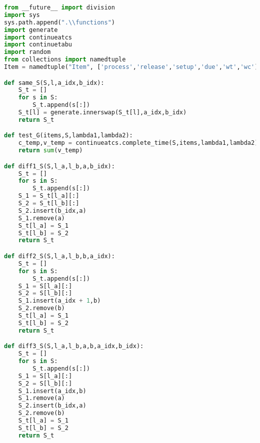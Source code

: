 \begin{lstlisting}[language = Python]
from __future__ import division
import sys
sys.path.append(".\\functions")
import generate
import continueatcs
import continuetabu
import random
from collections import namedtuple
Item = namedtuple("Item", ['process','release','setup','due','wt','wc'])

def same_S(S,l,a_idx,b_idx):
	S_t = []
	for s in S:
		S_t.append(s[:])
	S_t[l] = generate.innerswap(S_t[l],a_idx,b_idx)
	return S_t

def test_G(items,S,lambda1,lambda2):
	c_temp,v_temp = continueatcs.complete_time(S,items,lambda1,lambda2)
	return sum(v_temp)

def diff1_S(S,l_a,l_b,a,b_idx):
	S_t = []
	for s in S:
		S_t.append(s[:])
	S_1 = S_t[l_a][:]
	S_2 = S_t[l_b][:]
	S_2.insert(b_idx,a)
	S_1.remove(a)
	S_t[l_a] = S_1
	S_t[l_b] = S_2
	return S_t

def diff2_S(S,l_a,l_b,b,a_idx):
	S_t = []
	for s in S:
		S_t.append(s[:])
	S_1 = S[l_a][:]
	S_2 = S[l_b][:]
	S_1.insert(a_idx + 1,b)
	S_2.remove(b)
	S_t[l_a] = S_1
	S_t[l_b] = S_2	
	return S_t

def diff3_S(S,l_a,l_b,a,b,a_idx,b_idx):
	S_t = []
	for s in S:
		S_t.append(s[:])
	S_1 = S[l_a][:]
	S_2 = S[l_b][:]
	S_1.insert(a_idx,b)
	S_1.remove(a)
	S_2.insert(b_idx,a)
	S_2.remove(b)
	S_t[l_a] = S_1
	S_t[l_b] = S_2	
	return S_t


\end{lstlisting}
